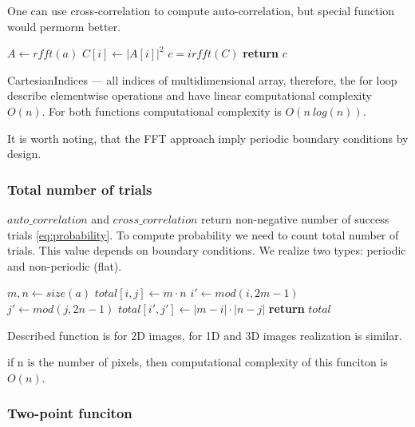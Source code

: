 \documentclass[reprint,amsmath,amssymb,aps,pre,showkeys,showpacs,nofootinbib]{revtex4-1}
\begin{document}
One can use cross-correlation to compute auto-correlation,
but special function would permorm better.

\begin{algorithmic}[1]
    \State $A \gets rfft(a)$
      \State $C[i] \gets |A[i]|^2$
    \EndFor
    \State $c = irfft(C)$ 
    \State \textbf{return} $c$
  \EndProcedure
\end{algorithmic}

CartesianIndices --- all indices of multidimensional array,
therefore, the for loop describe elementwise operations
and have linear computational complexity $O(n)$.
For both functions computational complexity is $O(n\ log(n))$.

It is worth noting, that the FFT approach imply
periodic boundary conditions by design.

\subsubsection{Total number of trials}

$auto\_correlation$ and $cross\_correlation$ return non-negative number
of success trials \cref{eq:probability}.
To compute probability we need to count total number of trials.
This value depends on boundary conditions.
We realize two types: periodic and non-periodic (flat).

\begin{algorithmic}[1]
    \State $m, n \gets size(a)$
          \State $total[i, j] \gets m \cdot n$
        \EndFor
      \EndFor
    \Else
          \State $i' \gets mod(i, 2m - 1)$
          \State $j' \gets mod(j, 2n - 1)$
          \State $total[i', j'] \gets |m - i| \cdot |n - j|$
        \EndFor
      \EndFor
    \EndIf
    \State \textbf{return} $total$
  \EndProcedure
\end{algorithmic}

Described function is for 2D images,
for 1D and 3D images realization is similar.

if n is the number of pixels, then computational complexity
of this funciton is $O(n)$.

\subsubsection{Two-point funciton}
\end{document}
